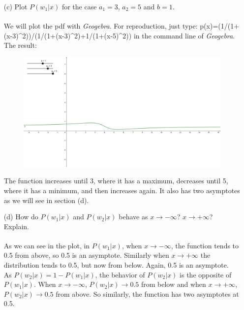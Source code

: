 \documentclass[10pt]{article}
\begin{document}
\begin{enumerate}
\Large
  \item[(c)] Plot $P(w_1|x)$ for the case $a_1=3$, $a_2=5$ and $b=1$.\\ \ \\
\normalsize
We will plot the pdf with \textit{Geogebra}. For reproduction, just type: p(x)=(1/(1+(x-3)\^{}2))/(1/(1+(x-3)\^{}2)+1/(1+(x-5)\^{}2)) in the command line of \textit{Geogebra}. The result:
\begin{figure}[h]
\centering
\includegraphics[scale=0.4]{7c}
\end{figure}
The function increases until 3, where it has a maximum, decreases until 5, where it has a minimum, and then increases again. It also has two asymptotes as we will see in section (d). \\
\Large
  \item[(d)] How do $P(w_1|x)$ and $P(w_2|x)$ behave as $x \rightarrow -\infty$? $x \rightarrow +\infty$? Explain.\\ \ \\
\normalsize
As we can see in the plot, in $P(w_1|x)$, when $x \rightarrow -\infty$, the function tends to 0.5 from above, so 0.5 is an asymptote. Similarly when $x \rightarrow +\infty$ the distribution tends to 0.5, but now from below. Again, 0.5 is an asymptote. \\

As $P(w_2|x)=1-P(w_1|x)$, the behavior of $P(w_2|x)$ is the opposite of $P(w_1|x)$. When $x \rightarrow -\infty$, $P(w_2|x)\rightarrow 0.5$ from below and when $x \rightarrow +\infty$, $P(w_2|x)\rightarrow 0.5$ from above. So similarly, the function has two asymptotes at 0.5. \\


\end{enumerate}
\end{document}
